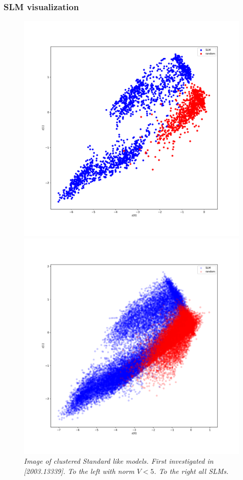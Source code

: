 \documentclass{beamer}
\begin{document}
\begin{frame}
\frametitle{SLM visualization}
\begin{figure}
	\begin{minipage}{0.48\linewidth}
	\includegraphics[scale=0.21]{ae_slm_norm.pdf}
	\end{minipage}
	\begin{minipage}{0.48\linewidth}
		\includegraphics[scale=0.21]{ae_slm_all.pdf}
	\end{minipage}
	\caption{\it Image of clustered Standard like models. First investigated in {\color{blue}[2003.13339]}. To the left with norm $V<5$. To the right all SLMs.}
\end{figure}
\end{frame}
\end{document}
